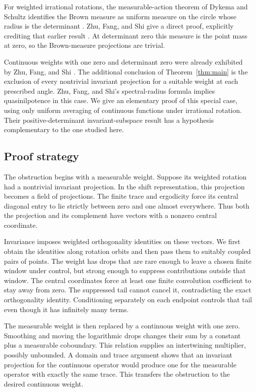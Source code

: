 For weighted irrational rotations, the measurable-action theorem of
Dykema and Schultz identifies the Brown measure as uniform measure on
the circle whose radius is the determinant
\citep[Theorem~5.4]{dykema-schultz}.  Zhu, Fang, and Shi give a direct
proof, explicitly crediting that earlier result
\citep[Theorem~5.3]{zfs}.  At determinant zero this measure is the point
mass at zero, so the Brown-measure projections are trivial.

Continuous weights with one zero and determinant zero were already
exhibited by Zhu, Fang, and Shi \citep[pp.~262--263]{zfs}.
The additional conclusion of Theorem~\ref{thm:main} is the exclusion of
every nontrivial invariant projection for a suitable weight at each
prescribed angle.  Zhu, Fang, and Shi's spectral-radius formula
\citep[Theorem~2.3]{zfs} implies quasinilpotence in this case.
We give an elementary proof of this special case, using only uniform
averaging of continuous functions under irrational rotation.
Their positive-determinant invariant-subspace result
\citep[Corollary~5.5]{zfs} has a hypothesis complementary to the one
studied here.

\subsection{Proof strategy}

The obstruction begins with a measurable weight.  Suppose its weighted
rotation had a nontrivial invariant projection.  In the shift
representation, this projection becomes a field of projections.  The
finite trace and ergodicity force its central diagonal entry to lie
strictly between zero and one almost everywhere.  Thus both the
projection and its complement have vectors with a nonzero central
coordinate.

Invariance imposes weighted orthogonality identities on these vectors.
We first obtain the identities along rotation orbits and then pass them
to suitably coupled pairs of points.  The weight has drops that are rare
enough to leave a chosen finite window under control, but strong enough
to suppress contributions outside that window.  The central coordinates
force at least one finite convolution coefficient to stay away from
zero.  The suppressed tail cannot cancel it, contradicting the exact
orthogonality identity.  Conditioning separately on each endpoint
controls that tail even though it has infinitely many terms.

The measurable weight is then replaced by a continuous weight with one
zero.  Smoothing and moving the logarithmic drops changes their sum by
a constant plus a measurable coboundary.  This relation supplies an
intertwining multiplier, possibly unbounded.  A domain and trace argument
shows that an invariant projection for the continuous operator would
produce one for the measurable operator with exactly the same trace.
This transfers the obstruction to the desired continuous weight.

